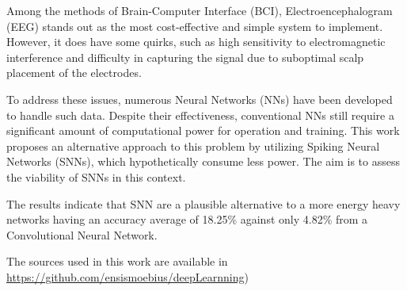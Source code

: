 \par Among the methods of Brain-Computer Interface (BCI), Electroencephalogram (EEG) stands out as the most cost-effective and simple system to implement. However, it does have some quirks, such as high sensitivity to electromagnetic interference and difficulty in capturing the signal due to suboptimal scalp placement of the electrodes.

\par To address these issues, numerous Neural Networks (NNs) have been developed to handle such data. Despite their effectiveness, conventional NNs still require a significant amount of computational power for operation and training. This work proposes an alternative approach to this problem by utilizing Spiking Neural Networks (SNNs), which hypothetically consume less power. The aim is to assess the viability of SNNs in this context.

\par The results indicate that SNN are a plausible alternative to a more energy heavy networks having an accuracy average of 18.25\% against only 4.82\% from a Convolutional Neural Network.

\par The sources used in this work are available in \url{https://github.com/ensismoebius/deepLearnning})